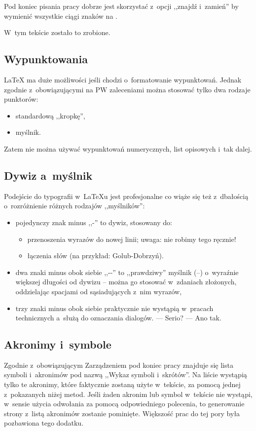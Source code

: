 Pod koniec pisania pracy dobrze jest skorzystać z~opcji ,,znajdź i~zamień'' by wymienić wszystkie ciągi znaków
 na .

W~tym tekście zostało to zrobione.

\subsection{Wypunktowania}
\LaTeX{}
ma duże możliwości jeśli chodzi o~formatowanie wypunktowań. Jednak zgodnie z~obowiązującymi na PW zaleceniami można
stosować tylko dwa rodzaje punktorów:
\begin{itemize}
    \item standardową ,,kropkę'',
    \item[--] myślnik.
\end{itemize}
Zatem nie można używać wypunktowań numerycznych, list opisowych i~tak dalej.

\subsection{Dywiz a~myślnik}
Podejście do typografii w~\LaTeX{u}
jest profesjonalne co wiąże się też z~dbałością o~rozróżnienie różnych rodzajów ,,myślników'':
\begin{itemize}
    \item pojedynczy znak minus ,,-'' to dywiz, stosowany do:
    \begin{itemize}
        \item przenoszenia wyrazów do nowej linii; uwaga: nie robimy tego ręcznie!
        \item łączenia słów (na przykład: Golub-Dobrzyń).
    \end{itemize}
    \item dwa znaki minus obok siebie ,,-{}-'' %
    to ,,prawdziwy'' myślnik (--) o~wyraźnie większej długości od dywizu -- można go stosować w~zdaniach złożonych,
    oddzielając spacjami od sąsiadujących z~nim wyrazów,
    \item
    trzy znaki minus obok siebie praktycznie nie wystąpią w~pracach technicznych a~służą do oznaczania dialogów. ---
    Serio? --- Ano tak.
\end{itemize}

\subsection{Akronimy i~symbole}
Zgodnie z~obowiązującym Zarządzeniem pod koniec pracy znajduje się lista symboli i~akronimów pod nazwą ,,Wykaz symboli
i~skrótów''. Na liście wystąpią tylko te akronimy, które faktycznie zostaną użyte w~tekście, za pomocą jednej
z~pokazanych niżej metod. Jeśli żaden akronim lub symbol w~tekście nie wystąpi, w~sensie użycia odwołania za pomocą
odpowiedniego polecenia, to generowanie strony z~listą akronimów zostanie pominięte. Większość prac do tej pory była
pozbawiona tego dodatku.

